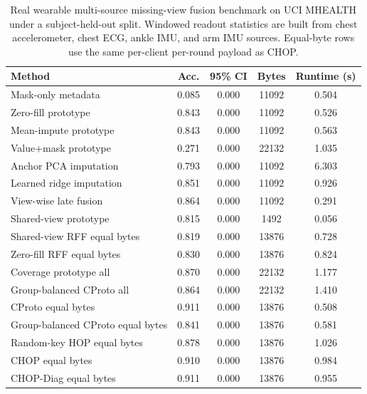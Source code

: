 \begin{table}[t]
\centering
\caption{Real wearable multi-source missing-view fusion benchmark on UCI MHEALTH under a subject-held-out split. Windowed readout statistics are built from chest accelerometer, chest ECG, ankle IMU, and arm IMU sources. Equal-byte rows use the same per-client per-round payload as CHOP.}
\label{tab:if-mhealth-fusion}
\scriptsize
\setlength{\tabcolsep}{3pt}
\renewcommand{\arraystretch}{0.94}
\begin{tabular}{lcccc}
\toprule
Method & Acc. & 95\% CI & Bytes & Runtime (s) \\
\midrule
Mask-only metadata & 0.085 & 0.000 & 11092 & 0.504 \\
Zero-fill prototype & 0.843 & 0.000 & 11092 & 0.526 \\
Mean-impute prototype & 0.843 & 0.000 & 11092 & 0.563 \\
Value+mask prototype & 0.271 & 0.000 & 22132 & 1.035 \\
Anchor PCA imputation & 0.793 & 0.000 & 11092 & 6.303 \\
Learned ridge imputation & 0.851 & 0.000 & 11092 & 0.926 \\
View-wise late fusion & 0.864 & 0.000 & 11092 & 0.291 \\
Shared-view prototype & 0.815 & 0.000 & 1492 & 0.056 \\
Shared-view RFF equal bytes & 0.819 & 0.000 & 13876 & 0.728 \\
Zero-fill RFF equal bytes & 0.830 & 0.000 & 13876 & 0.824 \\
Coverage prototype all & 0.870 & 0.000 & 22132 & 1.177 \\
Group-balanced CProto all & 0.864 & 0.000 & 22132 & 1.410 \\
CProto equal bytes & 0.911 & 0.000 & 13876 & 0.508 \\
Group-balanced CProto equal bytes & 0.841 & 0.000 & 13876 & 0.581 \\
Random-key HOP equal bytes & 0.878 & 0.000 & 13876 & 1.026 \\
CHOP equal bytes & 0.910 & 0.000 & 13876 & 0.984 \\
CHOP-Diag equal bytes & 0.911 & 0.000 & 13876 & 0.955 \\
\bottomrule
\end{tabular}
\end{table}
